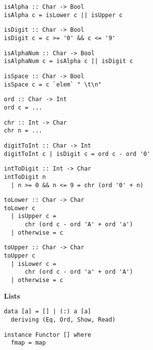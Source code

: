 \begin{multicols}{2}
\begin{verbatim}
isAlpha :: Char -> Bool 
isAlpha c = isLower c || isUpper c
\end{verbatim}
	
\begin{verbatim}
isDigit :: Char -> Bool 
isDigit c = c >= '0' && c <= '9'
\end{verbatim}
	
\begin{verbatim}
isAlphaNum :: Char -> Bool 
isAlphaNum c = isAlpha c || isDigit c
\end{verbatim}
	
\begin{verbatim}
isSpace :: Char -> Bool 
isSpace c = c `elem` " \t\n"
\end{verbatim}
	
\begin{verbatim}
ord :: Char -> Int 
ord c = ...
\end{verbatim}
	
\begin{verbatim}
chr :: Int -> Char 
chr n = ...
\end{verbatim}
	
\begin{verbatim}
digitToInt :: Char -> Int 
digitToInt c | isDigit c = ord c - ord '0'
\end{verbatim}
	
\begin{verbatim}
intToDigit :: Int -> Char 
intToDigit n 
  | n >= 0 && n <= 9 = chr (ord '0' + n)
\end{verbatim}
	
\begin{verbatim}
toLower :: Char -> Char 
toLower c 
  | isUpper c =
      chr (ord c - ord 'A' + ord 'a')
  | otherwise = c
\end{verbatim}

\begin{verbatim}
toUpper :: Char -> Char 
toUpper c 
  | isLower c =
      chr (ord c - ord 'a' + ord 'A')
  | otherwise = c
\end{verbatim}
	
\textbf{\large Lists}\\
	
\begin{verbatim}
data [a] = [] | (:) a [a]
  deriving (Eq, Ord, Show, Read)
\end{verbatim}
	
\begin{verbatim}
instance Functor [] where 
  fmap = map
\end{verbatim}
	

\end{multicols}
